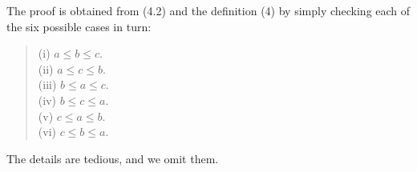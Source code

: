 The proof is obtained from (4.2) and the definition (4) by simply checking each of the six possible cases in turn: 
 
\begin{quote}
\begin{description}
\item[(i)  $a \leq b \leq c.$ ]
\item[(ii) $a \leq c \leq b.$ ]
\item[(iii) $b \leq a \leq c.$ ]
\item[(iv) $b \leq c \leq a.$ ]
\item[(v)  $c \leq a \leq b.$ ]
\item[(vi) $c \leq b \leq a.$] 
\end{description}
\end{quote}
\noindent The details are tedious, and we omit them.


